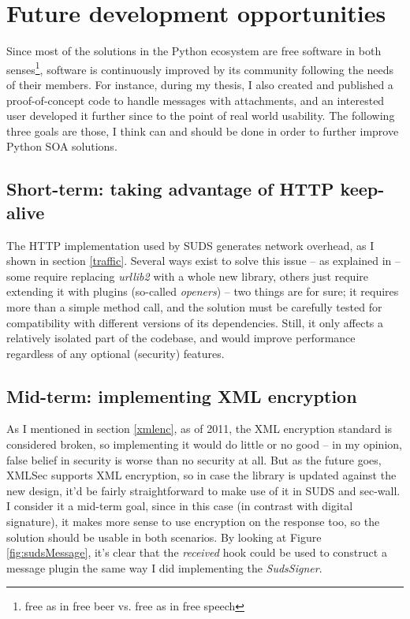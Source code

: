 \section{Future development opportunities}

Since most of the solutions in the Python ecosystem are free software in both senses\footnote{free as in free beer vs. free as in free speech}, software is continuously improved by its community following the needs of their members. For instance, during my thesis, I also created and published a proof-of-concept code to handle messages with attachments, and an interested user developed it further since to the point of real world usability. The following three goals are those, I think can and should be done in order to further improve Python SOA solutions.

\subsection{Short-term: taking advantage of HTTP keep-alive}
\label{keepalive}

The HTTP implementation used by SUDS generates network overhead, as I shown in section \ref{traffic}. Several ways exist to solve this issue -- as explained in \cite{so-1037406} -- some require replacing \emph{urllib2} with a whole new library, others just require extending it with plugins (so-called \emph{openers}) -- two things are for sure; it requires more than a simple method call, and the solution must be carefully tested for compatibility with different versions of its dependencies. Still, it only affects a relatively isolated part of the codebase, and would improve performance regardless of any optional (security) features.

\subsection{Mid-term: implementing XML encryption}

As I mentioned in section \ref{xmlenc}, as of 2011, the XML encryption standard is considered broken, so implementing it would do little or no good -- in my opinion, false belief in security is worse than no security at all. But as the future goes, XMLSec supports XML encryption, so in case the library is updated against the new design, it'd be fairly straightforward to make use of it in SUDS and sec-wall. I consider it a mid-term goal, since in this case (in contrast with digital signature), it makes more sense to use encryption on the response too, so the solution should be usable in both scenarios. By looking at Figure \ref{fig:sudsMessage}, it's clear that the \emph{received} hook could be used to construct a message plugin the same way I did implementing the \emph{SudsSigner}.

